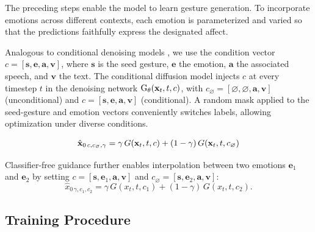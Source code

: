 The preceding steps enable the model to learn gesture generation. To incorporate emotions across different contexts, each emotion is parameterized and varied so that the predictions faithfully express the designated affect.

Analogous to conditional denoising models \cite{ho2022classifier, tevet2022human}, we use the condition vector
$c = [\mathbf{s}, \mathbf{e}, \mathbf{a}, \mathbf{v}]$,  
where $\mathbf{s}$ is the seed gesture, $\mathbf{e}$ the emotion, $\mathbf{a}$ the associated speech, and $\mathbf{v}$ the text.
The conditional diffusion model injects $c$ at every timestep $t$ in the denoising network $\text{G}_\theta(\mathbf{x}_{t}, t, c)$, with
$c_{\varnothing} = [\varnothing, \varnothing, \mathbf{a}, \mathbf{v}]$ (unconditional)
and $c = [\mathbf{s}, \mathbf{e}, \mathbf{a}, \mathbf{v}]$ (conditional).
A random mask applied to the seed-gesture and emotion vectors conveniently switches labels, allowing optimization under diverse conditions.

\begin{equation} \label{eq:denoise}
	\hat{\mathbf{x}}_{0\,c,c_{\varnothing},\gamma}
	= \gamma\, G(\mathbf{x}_{t}, t, c) + (1-\gamma)\, G(\mathbf{x}_{t}, t, c_{\varnothing})
\end{equation}

Classifier-free guidance \cite{ho2022classifier} further enables interpolation between two emotions
$\mathbf{e}_1$ and $\mathbf{e}_2$ by setting
$c = [\mathbf{s}, \mathbf{e}_{1}, \mathbf{a}, \mathbf{v}]$ and
$c_{\varnothing} = [\mathbf{s}, \mathbf{e}_{2}, \mathbf{a}, \mathbf{v}]$:
\[
\hat{x}_{0\,\gamma, c_{1}, c_{2}}
= \gamma\, G(x_{t}, t, c_{1}) + (1-\gamma)\, G(x_{t}, t, c_{2}).
\]

\subsection{Training Procedure}

